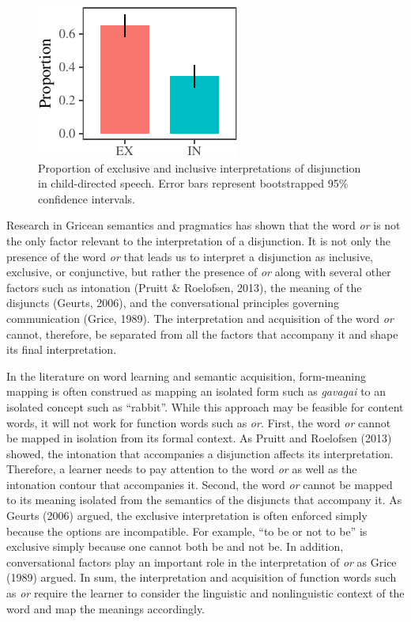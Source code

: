 \documentclass[,man,floatsintext]{apa6}
\begin{document}
\begin{figure}[tb]

{\centering \includegraphics{figs/interpretation-1} 

}

\caption{Proportion of exclusive and inclusive interpretations of disjunction in child-directed speech. Error bars represent bootstrapped 95\% confidence intervals.}\label{fig:interpretation}
\end{figure}

Research in Gricean semantics and pragmatics has shown that the word \emph{or} is not the only factor relevant to the interpretation of a disjunction. It is not only the presence of the word \emph{or} that leads us to interpret a disjunction as inclusive, exclusive, or conjunctive, but rather the presence of \emph{or} along with several other factors such as intonation (Pruitt \& Roelofsen, 2013), the meaning of the disjuncts (Geurts, 2006), and the conversational principles governing communication (Grice, 1989). The interpretation and acquisition of the word \emph{or} cannot, therefore, be separated from all the factors that accompany it and shape its final interpretation.

In the literature on word learning and semantic acquisition, form-meaning mapping is often construed as mapping an isolated form such as \emph{gavagai} to an isolated concept such as \enquote{rabbit}. While this approach may be feasible for content words, it will not work for function words such as \emph{or}. First, the word \emph{or} cannot be mapped in isolation from its formal context. As Pruitt and Roelofsen (2013) showed, the intonation that accompanies a disjunction affects its interpretation. Therefore, a learner needs to pay attention to the word \emph{or} as well as the intonation contour that accompanies it. Second, the word \emph{or} cannot be mapped to its meaning isolated from the semantics of the disjuncts that accompany it. As Geurts (2006) argued, the exclusive interpretation is often enforced simply because the options are incompatible. For example, \enquote{to be or not to be} is exclusive simply because one cannot both be and not be. In addition, conversational factors play an important role in the interpretation of \emph{or} as Grice (1989) argued. In sum, the interpretation and acquisition of function words such as \emph{or} require the learner to consider the linguistic and nonlinguistic context of the word and map the meanings accordingly.
\end{document}
